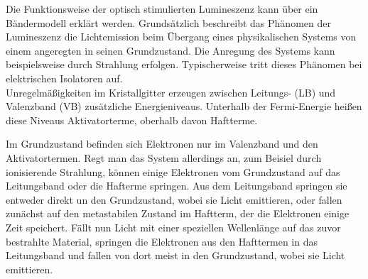 Die Funktionsweise der optisch stimulierten Lumineszenz kann über ein Bändermodell erklärt werden. Grundsätzlich beschreibt das Phänomen der Lumineszenz die Lichtemission beim Übergang eines physikalischen Systems von einem angeregten in seinen Grundzustand.
Die Anregung des Systems kann beispielsweise durch Strahlung erfolgen. Typischerweise tritt dieses Phänomen bei elektrischen Isolatoren auf.\\
Unregelmäßigkeiten im Kristallgitter erzeugen zwischen Leitungs- (LB) und Valenzband (VB) zusätzliche Energieniveaus. Unterhalb der Fermi-Energie heißen diese Niveaus Aktivatorterme, oberhalb davon Haftterme. 

\begin{center}
    \minipanf    
    \label{fig:band}
    \minipend
\end{center}

Im Grundzustand befinden sich Elektronen nur im Valenzband und den Aktivatortermen.
Regt man das System allerdings an, zum Beisiel durch ionisierende Strahlung, können einige Elektronen vom Grundzustand auf das Leitungsband oder die Hafterme springen. Aus dem Leitungsband springen sie entweder direkt un den Grundzustand, wobei sie Licht emittieren, oder fallen zunächst auf den metastabilen Zustand im Haftterm, der die Elektronen einige Zeit speichert.
Fällt nun Licht mit einer speziellen Wellenlänge auf das zuvor bestrahlte Material, springen die Elektronen aus den Hafttermen in das Leitungsband und fallen von dort meist in den Grundzustand, wobei sie Licht emittieren.

